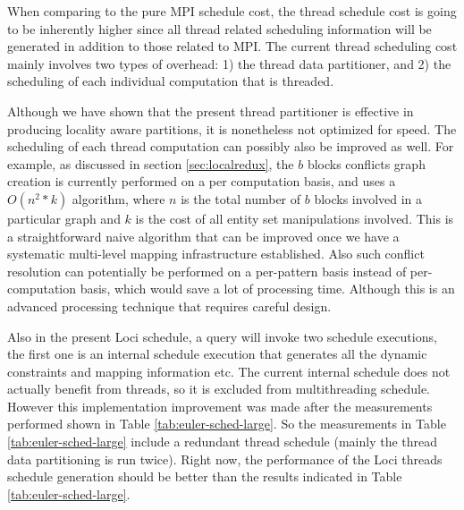 \documentclass{article}
\begin{document}
When comparing to the pure MPI schedule cost, the thread schedule cost
is going to be inherently higher since all thread related scheduling
information will be generated in addition to those related to MPI.  The
current thread scheduling cost mainly involves two types of overhead: 1)
the thread data partitioner, and 2) the scheduling of each individual
computation that is threaded.

Although we have shown that the present thread partitioner is effective
in producing locality aware partitions, it is nonetheless not optimized
for speed.  The scheduling of each thread computation can possibly also
be improved as well.  For example, as discussed in section
\ref{sec:localredux}, the $b$ blocks conflicts graph creation is
currently performed on a per computation basis, and uses a $O(n^2*k)$
algorithm, where $n$ is the total number of $b$ blocks involved in a
particular graph and $k$ is the cost of all entity set manipulations
involved.  This is a straightforward naive algorithm that can be
improved once we have a systematic multi-level mapping infrastructure
established.  Also such conflict resolution can potentially be performed
on a per-pattern basis instead of per-computation basis, which would
save a lot of processing time.  Although this is an advanced processing
technique that requires careful design.

Also in the present Loci schedule, a query will invoke two schedule
executions, the first one is an internal schedule execution that
generates all the dynamic constraints and mapping information etc.  The
current internal schedule does not actually benefit from threads, so it
is excluded from multithreading schedule.  However this implementation
improvement was made after the measurements performed shown in Table
\ref{tab:euler-sched-large}.  So the measurements in Table
\ref{tab:euler-sched-large} include a redundant thread schedule (mainly
the thread data partitioning is run twice).  Right now, the performance
of the Loci threads schedule generation should be better than the
results indicated in Table \ref{tab:euler-sched-large}.

\end{document}
